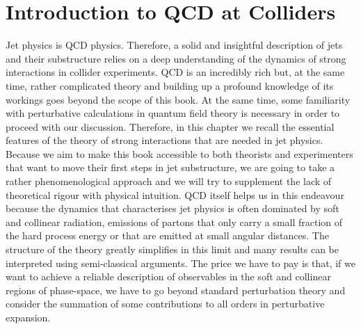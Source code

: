 %
\chapter{Introduction to QCD at Colliders}\label{chap:qcd-colliders}
Jet physics is QCD physics. Therefore, a solid and insightful
description of jets and their substructure relies on a deep understanding of the dynamics of strong interactions in collider experiments. 
%
QCD is an incredibly rich but, at the same time, rather complicated theory and building up a profound knowledge of its workings goes beyond the scope of this book. At the same time, some familiarity with perturbative calculations in quantum field theory is necessary in order to proceed with our discussion.
%
Therefore, in this chapter we recall the essential features of the theory of strong interactions that are needed in jet physics.
%
Because we aim to make this book accessible to both theorists and experimenters that want to move their first steps in jet substructure, we are going to take a rather phenomenological approach and we will try to supplement the lack of theoretical rigour with physical intuition. QCD itself helps us in this endeavour because the dynamics that characterises jet physics is often dominated by soft and collinear radiation, \ie emissions of partons that only carry a small fraction of the hard process energy or that are emitted at small angular distances. The structure of the theory greatly simplifies in this limit and many results can be interpreted using semi-classical arguments. The price we have to pay is that, if we want to achieve a reliable description of observables in the soft and collinear regions of phase-space, we have to go beyond standard perturbation theory and consider the summation of some contributions to all orders in perturbative expansion. 



